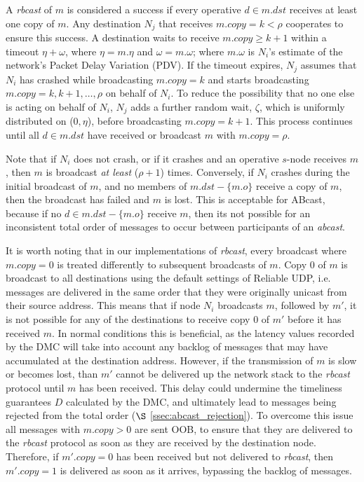    A \emph{rbcast} of $m$ is considered a success if every operative $d \in m.dst$ receives at least one copy of $m$.  Any destination $N_j$ that receives $m.copy = k < \rho$ cooperates to ensure this success.  A destination waits to receive $m.copy \geq k + 1$ within a timeout $\eta + \omega$, where $\eta= m.\eta$ and $\omega=m.\omega$; where $m.\omega$ is $N_i$'s estimate of the network's Packet Delay Variation (PDV).  If the timeout expires, $N_j$ assumes that $N_i$ has crashed while broadcasting $m.copy = k$ and starts broadcasting $m.copy = k, k+1,\ldots, \rho$ on behalf of $N_i$. To reduce the possibility that no one else is acting on behalf of $N_i$, $N_j$ adds a further random wait, $\zeta$, which is uniformly distributed on ($0,\eta$), before broadcasting $m.copy = k+1$.  This process continues until all $d \in m.dst$ have received or broadcast $m$ with $m.copy = \rho$.  
    
    Note that if $N_i$ does not crash, or if it crashes and an operative $s$-node receives $m$, then $m$ is broadcast \emph{at least} ($\rho + 1$) times.  Conversely, if $N_i$ crashes during the initial broadcast of $m$, and no members of $m.dst - \{m.o\}$ receive a copy of $m$, then the broadcast has failed and $m$ is lost.  This is acceptable for \textsf{ABcast}, because if no $d \in m.dst - \{m.o\}$ receive $m$, then its not possible for an inconsistent total order of messages to occur between participants of an \emph{abcast}.  
    
    It is worth noting that in our implementations of \emph{rbcast}, every broadcast where $m.copy = 0$ is treated differently to subsequent broadcasts of $m$.  Copy 0 of $m$ is broadcast to all destinations using the default settings of Reliable UDP, i.e. messages are delivered in the same order that they were originally unicast from their source address.  This means that if node $N_i$ broadcasts $m$, followed by $m'$, it is not possible for any of the destinations to receive copy 0 of $m'$ before it has received $m$.  In normal conditions this is beneficial, as the latency values recorded by the DMC will take into account any backlog of messages that may have accumulated at the destination address.  However, if the transmission of $m$ is slow or becomes lost, than $m'$ cannot be delivered up the network stack to the \emph{rbcast} protocol until $m$ has been received.  This delay could undermine the timeliness guarantees $D$ calculated by the DMC, and ultimately lead to messages being rejected from the total order ($\S$ \ref{ssec:abcast_rejection}).  To overcome this issue all messages with $m.copy > 0$ are sent OOB, to ensure that they are delivered to the \emph{rbcast} protocol as soon as they are received by the destination node.  Therefore, if $m'.copy = 0$ has been received but not delivered to \emph{rbcast}, then $m'.copy = 1$ is delivered as soon as it arrives, bypassing the backlog of messages.  
    
